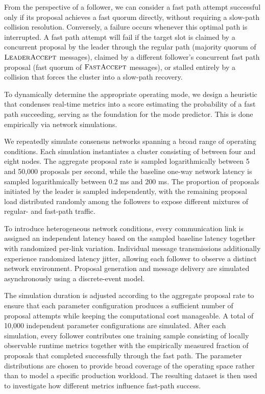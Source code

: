 From the perspective of a follower, we can consider a fast path attempt successful only if its proposal achieves a fast quorum directly, without requiring a slow-path collision resolution. Conversely, a failure occurs whenever this optimal path is interrupted. A fast path attempt will fail if the target slot is claimed by a concurrent proposal by the leader through the regular path (majority quorum of $\textsc{LeaderAccept}$ messages), claimed by a different follower's concurrent fast path proposal (fast quorum of $\textsc{FastAccept}$ messages), or stalled entirely by a collision that forces the cluster into a slow-path recovery.

To dynamically determine the appropriate operating mode, we design a heuristic that condenses real-time metrics into a score estimating the probability of a fast path succeeding, serving as the foundation for the mode predictor. This is done empirically via network simulations.

We repeatedly simulate consensus networks spanning a broad range of operating conditions. Each simulation instantiates a cluster consisting of between four and eight nodes. The aggregate proposal rate is sampled logarithmically between 5 and 50,000 proposals per second, while the baseline one-way network latency is sampled logarithmically between 0.2 ms and 200 ms. The proportion of proposals initiated by the leader is sampled independently, with the remaining proposal load distributed randomly among the followers to expose different mixtures of regular- and fast-path traffic.

To introduce heterogeneous network conditions, every communication link is assigned an independent latency based on the sampled baseline latency together with randomized per-link variation. Individual message transmissions additionally experience randomized latency jitter, allowing each follower to observe a distinct network environment. Proposal generation and message delivery are simulated asynchronously using a discrete-event model.

The simulation duration is adjusted according to the aggregate proposal rate to ensure that each parameter configuration produces a sufficient number of proposal attempts while keeping the computational cost manageable. A total of 10,000 independent parameter configurations are simulated. After each simulation, every follower contributes one training sample consisting of locally observable runtime metrics together with the empirically measured fraction of proposals that completed successfully through the fast path. The parameter distributions are chosen to provide broad coverage of the operating space rather than to model a specific production workload. The resulting dataset is then used to investigate how different metrics influence fast-path success.

